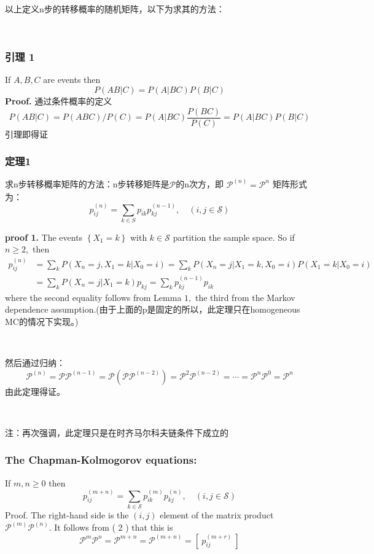 \documentclass[UTF8]{ctexart}
\begin{document}
以上定义n步的转移概率的随机矩阵，以下为求其的方法：

\

\subsubsection{引理 1} If $A, B, C$ are events then
$$
P(A B | C)=P(A | B C) P(B | C)
$$
\textbf{Proof.} 通过条件概率的定义
$$
P(A B |C)=
P(A B C) / P(C)=P(A | B C)\frac{P(B C) }{P(C)}
=P(A | B C) P(B | C)
$$
引理即得证

\subsubsection{定理1}

求n步转移概率矩阵的方法：n步转移矩阵是$\mathcal{P}$的n次方，即
$\mathcal{P}^{(n)}=\mathcal{P}^{n}$
矩阵形式为：
$$
p_{i j}^{(n)}=\sum_{k \in S} p_{i k} p_{k j}^{(n-1)}, \quad(i, j \in \mathcal{S})
$$

\textbf{proof 1.} The events $\left\{X_{1}=k\right\}$ with $k \in \mathcal{S}$ partition the sample space. So if $n \geq 2,$ then
$$
\begin{aligned}
p_{i j}^{(n)} &=\sum_{k} P\left(X_{n}=j, X_{1}=k | X_{0}=i\right)=\sum_{k} P\left(X_{n}=j | X_{1}=k, X_{0}=i\right) P\left(X_{1}=k | X_{0}=i\right) \\
&=\sum_{k} P\left(X_{n}=j | X_{1}=k\right) p_{k j}=\sum_{k} p_{k j}^{(n-1)} p_{i k}
\end{aligned}
$$
where the second equality follows from Lemma $1,$ the third from the Markov dependence assumption.(由于上面的p是固定的所以，此定理只在homogeneous MC的情况下实现。)

\

然后通过归纳：
$$
\mathcal{P}^{(n)}=\mathcal{P} \mathcal{P}^{(n-1)}=\mathcal{P}\left(\mathcal{P} \mathcal{P}^{(n-2)}\right)=\mathcal{P}^{2} \mathcal{P}^{(n-2)}=\cdots=\mathcal{P}^{n} \mathcal{P}^{0}=\mathcal{P}^{n}
$$
由此定理得证。

\

注：再次强调，此定理只是在时齐马尔科夫链条件下成立的

\subsubsection{The Chapman-Kolmogorov equations:} If $m, n \geq 0$ then
$$
p_{i j}^{(m+n)}=\sum_{k \in \mathcal{S}} p_{i k}^{(m)} p_{k j}^{(n)}, \quad(i, j \in \mathcal{S})
$$
Proof. The right-hand side is the $(i, j)$ element of the matrix product $\mathcal{P}^{(m)} \mathcal{P}^{(n)} .$ It follows from ( 2 ) that this is
$$
\mathcal{P}^{m} \mathcal{P}^{n}=\mathcal{P}^{m+n}=\mathcal{P}^{(m+n)}=[\  p_{i j}^{(m+r)}\ ]
$$
\end{document}
